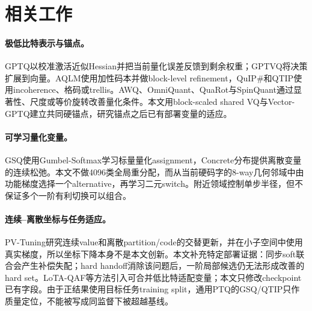 \section{相关工作}
\paragraph{极低比特表示与锚点。}GPTQ以校准激活近似Hessian并把当前量化误差反馈到剩余权重\cite{gptq}；GPTVQ将决策扩展到向量\cite{gptvq}。AQLM使用加性码本并做block-level refinement\cite{aqlm}，QuIP\#和QTIP使用incoherence、格码或trellis\cite{quipsharp,qtip}。AWQ、OmniQuant、QuaRot与SpinQuant通过显著性、尺度或等价旋转改善量化条件\cite{awq,omniquant,quarot,spinquant}。本文用block-scaled shared VQ与Vector-GPTQ建立共同硬锚点，研究锚点之后已有部署变量的适应。

\paragraph{可学习量化变量。}GSQ使用Gumbel-Softmax学习标量量化assignment\cite{gsq,gumbel}，Concrete分布提供离散变量的连续松弛\cite{concrete}。本文不做4096类全局重分配，而从当前硬码字的8-way几何邻域中由功能梯度选择一个alternative，再学习二元switch。附近领域控制单步半径，但不保证多个一阶有利切换可以组合。

\paragraph{连续--离散坐标与任务适应。}PV-Tuning研究连续value和离散partition/code的交替更新，并在小子空间中使用真实梯度\cite{pvtuning}，所以坐标下降本身不是本文创新。本文补充特定部署证据：同步soft联合会产生补偿失配；hard handoff消除该问题后，一阶局部候选仍无法形成改善的hard set。LoTA-QAF等方法引入可合并低比特适配变量\cite{lotaqaf}；本文只修改checkpoint已有字段。由于正结果使用目标任务training split，通用PTQ的GSQ/QTIP只作质量定位，不能被写成同监督下被超越基线。
